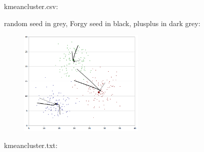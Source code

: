 \begin{scriptsize}
\begin{ttfamily}

\end{ttfamily}
\end{scriptsize}

kmeancluster.csv:\\
\begin{scriptsize}
\begin{ttfamily}

\end{ttfamily}
\end{scriptsize}

random seed in grey, Forgy seed in black, plusplus in dark grey:\\
\begin{center}
\begin{figure}[H]
\centering\includegraphics[width=6cm]{./kmeansclustering.png}\\
\end{figure}
\end{center}

kmeancluster.txt:\\
\begin{scriptsize}
\begin{ttfamily}

\end{ttfamily}
\end{scriptsize}

